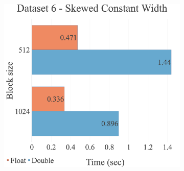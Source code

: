 \begin{figure}[H]
\begin{adjustwidth}{-2cm}{-2cm}
\begin{subfigure}{.62\textwidth}
\end{subfigure}
\par\bigskip
\par\bigskip
\centering
\begin{subfigure}{.62\textwidth}
  \includegraphics[width=1\textwidth]{img/experiments/multi-blocks-6_SKEWEDCONSTWIDTH.png}
\end{subfigure}
\end{adjustwidth}
\end{figure}


